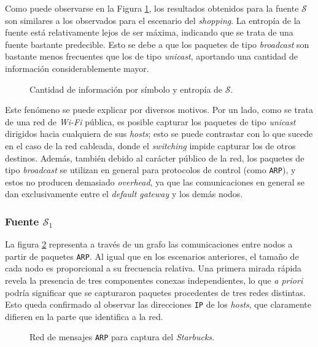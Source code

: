 Como puede observarse en la Figura \ref{res:esc3:s}, los resultados
obtenidos para la fuente $\mathcal{S}$ son similares a los observados para el
escenario del \emph{shopping}. La entropía de la fuente está relativamente
lejos de ser máxima, indicando que se trata de una fuente bastante predecible.
Esto se debe a que los paquetes de tipo \emph{broadcast} son bastante menos
frecuentes que los de tipo \emph{unicast}, aportando una cantidad de
información considerablemente mayor.

\begin{figure}[H]
    \caption{Cantidad de información por símbolo y entropía de $\mathcal{S}$.}
    \label{res:esc3:s}
\end{figure}

Este fenómeno se puede explicar por diversos motivos. Por un lado, como se
trata de una red de \emph{Wi-Fi} pública, es posible capturar los paquetes de tipo
\emph{unicast} dirigidos hacia cualquiera de sus \emph{hosts}; esto se puede
contrastar con lo que sucede en el caso de la red cableada, donde el
\emph{switching} impide capturar los de otros destinos. Además, también debido
al carácter público de la red, los paquetes de tipo
\emph{broadcast} se utilizan en general para protocolos de control (como
\texttt{ARP}), y estos no producen demasiado \emph{overhead}, ya que las
comunicaciones en general se dan exclusivamente entre el \emph{default gateway}
y los demás nodos.

\subsubsection{Fuente $\mathcal{S}_1$}

La figura \ref{res:esc3:graph} representa a través de un grafo las
comunicaciones entre nodos a partir de paquetes \texttt{ARP}. Al igual que
en los escenarios anteriores, el tamaño de cada nodo es proporcional a su
frecuencia relativa. Una primera mirada rápida revela la presencia de tres
componentes conexas independientes, lo que \emph{a priori} podría significar
que se capturaron paquetes procedentes de tres redes distintas. Esto queda
confirmado al observar las direcciones \texttt{IP} de los \emph{hosts}, que
claramente difieren en la parte que identifica a la red.

\begin{figure}[H]
    \caption{Red de mensajes \texttt{ARP} para captura del \emph{Starbucks}.}
    \label{res:esc3:graph}
\end{figure}

